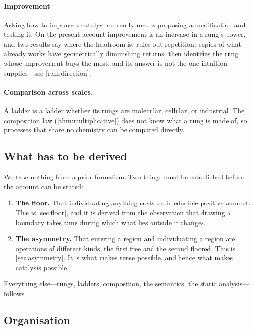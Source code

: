 \documentclass[11pt,twocolumn,a4paper]{article}
\theoremstyle{plain}
\theoremstyle{definition}
\theoremstyle{remark}
\begin{document}
\paragraph{Improvement.} Asking how to improve a catalyst currently means
proposing a modification and testing it. On the present account improvement is
an increase in a rung's power, and two results say where the headroom is.
 rules out repetition: copies of what already works have
geometrically diminishing returns.  then identifies the rung
whose improvement buys the most, and its answer is not the one intuition
supplies---see \cref{rem:direction}.

\paragraph{Comparison across scales.} A ladder is a ladder whether its rungs are
molecular, cellular, or industrial. The composition law
(\cref{thm:multiplicative}) does not know what a rung is made of, so processes
that share no chemistry can be compared directly.

\subsection{What has to be derived}

We take nothing from a prior formalism. Two things must be established before
the account can be stated:

\begin{enumerate}[label=(\roman*),leftmargin=2.4em]
\item \textbf{The floor.} That individuating anything costs an irreducible
positive amount. This is \cref{sec:floor}, and it is derived from the
observation that drawing a boundary takes time during which what lies outside it
changes.
\item \textbf{The asymmetry.} That entering a region and individuating a region
are operations of different kinds, the first free and the second floored. This
is \cref{sec:asymmetry}. It is what makes reuse possible, and hence what makes
catalysis possible.
\end{enumerate}

Everything else---rungs, ladders, composition, the semantics, the static
analysis---follows.

\subsection{Organisation}
\end{document}
